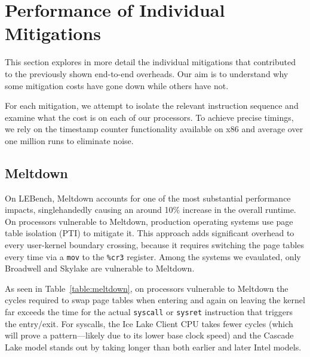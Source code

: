\section{Performance of Individual Mitigations}
\label{s:eval}

This section explores in more detail the individual mitigations that contributed
to the previously shown end-to-end overheads.
Our aim is to understand why some mitigation costs have gone down while others have not.

For each mitigation, we attempt to isolate the relevant instruction sequence and examine what the cost is on each of our processors.
To achieve precise timings, we rely on the timestamp counter functionality available on x86 and average over one million runs to eliminate noise.

\subsection{Meltdown}

On LEBench, Meltdown accounts for one of the most substantial performance impacts, singlehandedly causing an around 10\% increase in the overall runtime.
On processors vulnerable to Meltdown, production operating systems use page table isolation (PTI) to mitigate it.
This approach adds significant overhead to every user-kernel boundary crossing, because it requires switching the page tables every time via a \texttt{mov} to the \texttt{\%cr3} register.
Among the systems we evaulated, only Broadwell and Skylake are vulnerable to Meltdown.

As seen in Table~\ref{table:meltdown}, on processors vulnerable to Meltdown the cycles required to swap page tables when entering and again on leaving the kernel far exceeds the time for the actual \texttt{syscall} or \texttt{sysret} instruction that triggers the entry/exit.
For syscalls, the Ice Lake Client CPU takes fewer cycles (which will prove a pattern---likely due to its lower base clock speed) and the Cascade Lake model stands out by taking longer than both earlier and later Intel models.

